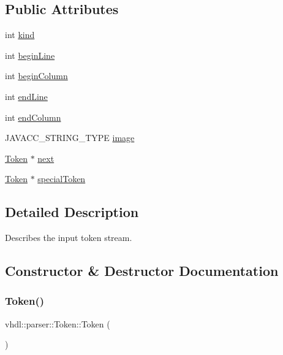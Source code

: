 \subsection*{Public Attributes}
\begin{DoxyCompactItemize}
\item 
int \mbox{\hyperlink{classvhdl_1_1parser_1_1_token_a021bfae89b9eec39a87db9577508916c}{kind}}
\item 
int \mbox{\hyperlink{classvhdl_1_1parser_1_1_token_a7fdeaf5cb35f8a5ecab251ddcd4b5909}{begin\+Line}}
\item 
int \mbox{\hyperlink{classvhdl_1_1parser_1_1_token_a6fc8fab679c3f9110cb17c520836d02c}{begin\+Column}}
\item 
int \mbox{\hyperlink{classvhdl_1_1parser_1_1_token_ae891f2c047fc387a551a1ef49036a685}{end\+Line}}
\item 
int \mbox{\hyperlink{classvhdl_1_1parser_1_1_token_ac61778db323adf6f0b89f9eed2b672cf}{end\+Column}}
\item 
J\+A\+V\+A\+C\+C\+\_\+\+S\+T\+R\+I\+N\+G\+\_\+\+T\+Y\+PE \mbox{\hyperlink{classvhdl_1_1parser_1_1_token_abafca7a99f0aca2f76d1d9094bf22e9c}{image}}
\item 
\mbox{\hyperlink{classvhdl_1_1parser_1_1_token}{Token}} $\ast$ \mbox{\hyperlink{classvhdl_1_1parser_1_1_token_a82b2c4853d3ce100b0fee664d8460b69}{next}}
\item 
\mbox{\hyperlink{classvhdl_1_1parser_1_1_token}{Token}} $\ast$ \mbox{\hyperlink{classvhdl_1_1parser_1_1_token_a9d02434823908bf848cdc9bb14f52b73}{special\+Token}}
\end{DoxyCompactItemize}


\subsection{Detailed Description}
Describes the input token stream. 

\subsection{Constructor \& Destructor Documentation}
\mbox{\label{classvhdl_1_1parser_1_1_token_af4c8d87a0456cd4ce8a65662fa507bb1}} 
\subsubsection{\texorpdfstring{Token()}{Token()}\hspace{0.1cm}{\footnotesize\ttfamily [1/3]}}
{\footnotesize\ttfamily vhdl\+::parser\+::\+Token\+::\+Token (\begin{DoxyParamCaption}{ }\end{DoxyParamCaption})}

